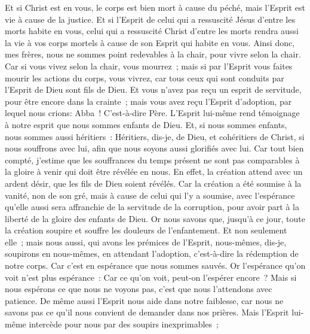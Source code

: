 \begin{multicols}{2}
Et si Christ est en vous, le corps est bien mort à cause du péché, mais l'Esprit est vie à cause de la justice.
Et si l'Esprit de celui qui a ressuscité Jésus d'entre les morts habite en vous, celui qui a ressuscité Christ d'entre les morts rendra aussi la vie à vos corps mortels à cause de son Esprit qui habite en vous.
Ainsi donc, mes frères, nous ne sommes point redevables à la chair, pour vivre selon la chair.
Car si vous vivez selon la chair, vous mourrez~; mais si par l'Esprit vous faites mourir les actions du corps, vous vivrez,
car tous ceux qui sont conduits par l'Esprit de Dieu sont fils de Dieu.
Et vous n'avez pas reçu un esprit de servitude, pour être encore dans la crainte~; mais vous avez reçu l'Esprit d'adoption, par lequel nous crions: Abba~! C'est-à-dire Père.
L'Esprit lui-même rend témoignage à notre esprit que nous sommes enfants de Dieu.
Et, si nous sommes enfants, nous sommes aussi héritiers~: Héritiers, dis-je, de Dieu, et cohéritiers de Christ, si nous souffrons avec lui, afin que nous soyons aussi glorifiés avec lui.
Car tout bien compté, j'estime que les souffrances du temps présent ne sont pas comparables à la gloire à venir qui doit être révélée en nous.
En effet, la création attend avec un ardent désir, que les fils de Dieu soient révélés.
Car la création a été soumise à la vanité, non de son gré, mais à cause de celui qui l'y a soumise,
avec l'espérance qu'elle aussi sera affranchie de la servitude de la corruption, pour avoir part à la liberté de la gloire des enfants de Dieu.
Or nous savons que, jusqu'à ce jour, toute la création soupire et souffre les douleurs de l'enfantement.
Et non seulement elle~; mais nous aussi, qui avons les prémices de l'Esprit, nous-mêmes, dis-je, soupirons en nous-mêmes, en attendant l'adoption, c'est-à-dire la rédemption de notre corps.
Car c'est en espérance que nous sommes sauvés. Or l'espérance qu'on voit n'est plus espérance~: Car ce qu'on voit, peut-on l'espérer encore~?
Mais si nous espérons ce que nous ne voyons pas, c'est que nous l'attendons avec patience.
De même aussi l'Esprit nous aide dans notre faiblesse, car nous ne savons pas ce qu'il nous convient de demander dans nos prières. Mais l'Esprit lui-même intercède pour nous par des soupirs inexprimables~;

\end{multicols}
